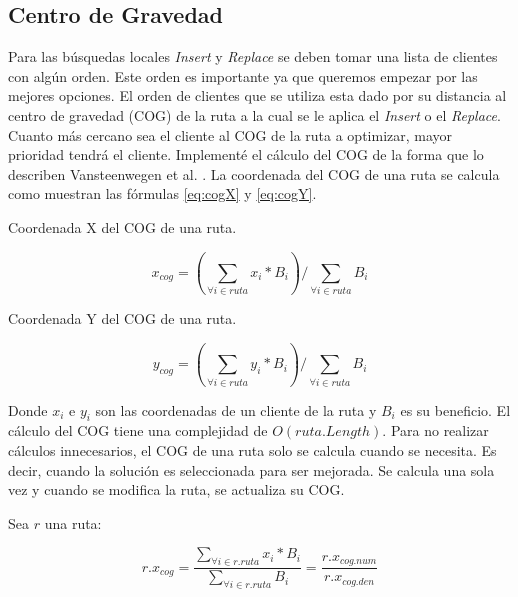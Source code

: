 \subsection{Centro de Gravedad}

Para las búsquedas locales \textit{Insert} y \textit{Replace} se deben tomar una lista de clientes con algún orden. Este orden es importante ya que queremos empezar por las mejores opciones. El orden de clientes que se utiliza esta dado por su distancia al centro de gravedad (COG) de la ruta a la cual se le aplica el \textit{Insert} o el \textit{Replace}. Cuanto más cercano sea el cliente al COG de la ruta a optimizar, mayor prioridad tendrá el cliente. Implementé el cálculo del COG de la forma que lo describen Vansteenwegen et al. \cite{VansteenwegenSouffriauBergheOudheusden}. La coordenada del COG de una ruta se calcula como muestran las fórmulas \ref{eq:cogX} y \ref{eq:cogY}.

\begin{mycapequ}[!ht]
	\caption{Coordenada X del COG de una ruta.}
	\begin{equation} \label{eq:cogX}
	x_{cog} = (\sum_{\forall i \in ruta} x_i * B_i) / \sum_{\forall i \in ruta} B_i
	\end{equation}
\end{mycapequ}

\begin{mycapequ}[!ht]
	\caption{Coordenada Y del COG de una ruta.}
	\begin{equation} \label{eq:cogY}
	y_{cog} = (\sum_{\forall i \in ruta} y_i * B_i) / \sum_{\forall i \in ruta} B_i
	\end{equation}
\end{mycapequ}

\bigskip

Donde $x_i$ e $y_i$ son las coordenadas de un cliente de la ruta y $B_i$ es su beneficio. El cálculo del COG tiene una complejidad de $O(ruta.Length)$. Para no realizar cálculos innecesarios, el COG de una ruta solo se calcula cuando se necesita. Es decir, cuando la solución es seleccionada para ser mejorada. Se calcula una sola vez y cuando se modifica la ruta, se actualiza su COG.

\bigskip

Sea $r$ una ruta:

\begin{equation} \label{eq:cogNumDen}
r.x_{cog} =  \frac{\sum_{\forall i \in r.ruta} x_i * B_i}{\sum_{\forall i \in r.ruta} B_i}  = \frac{r.x_{cog.num}}{r.x_{cog.den}}
\end{equation}


